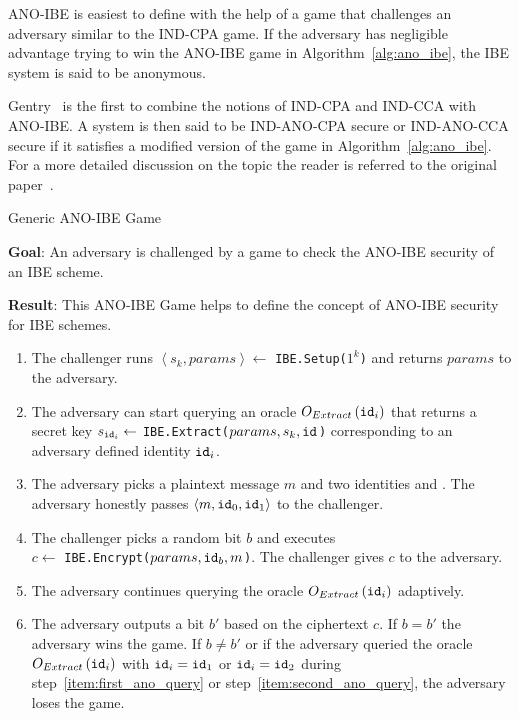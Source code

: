 ANO-IBE is easiest to define with the help of a game that challenges an adversary similar to the IND-CPA game. If the adversary has negligible advantage trying to win the ANO-IBE game in Algorithm~\ref{alg:ano_ibe}, the IBE system is said to be anonymous.

Gentry~\cite{art:Gentry06} is the first to combine the notions of IND-CPA and IND-CCA with ANO-IBE. A system is then said to be IND-ANO-CPA secure or IND-ANO-CCA secure if it satisfies a modified version of the game in Algorithm~\ref{alg:ano_ibe}. For a more detailed discussion on the topic the reader is referred to the original paper~\cite{art:Gentry06}.

\begin{algorithm}
\caption{Generic ANO-IBE Game~\cite{thesis:Alfredo08}}
\label{alg:ano_ibe}
 \textbf{Goal}: An adversary is challenged by a game to check the ANO-IBE security of an IBE scheme.
 
 \textbf{Result}: This ANO-IBE Game helps to define the concept of ANO-IBE security for IBE schemes.
 \begin{enumerate}
  \item The challenger runs $\left< s_k, params\right> \leftarrow$ \texttt{IBE.Setup($1^k$)} and returns $params$ to the adversary.
  \item \label{item:first_ano_query} The adversary can start querying an oracle $O_{Extract} \left( \mathtt{id}_{i} \right)$ that returns a secret key $s_{\mathtt{id}_{i}} \leftarrow$ \texttt{IBE.Extract($params, s_k, \mathtt{id}_{}$)} corresponding to an adversary defined identity $\mathtt{id}_{i}$.
  \item The adversary picks a plaintext message $m$ and two identities  and . The adversary honestly passes $\left< m, \mathtt{id}_{0}, \mathtt{id}_{1} \right>$ to the challenger.
  \item The challenger picks a random bit $b$ and executes \\ $c \leftarrow$ \texttt{IBE.Encrypt($params, \mathtt{id}_{b}, m$)}. The challenger gives $c$ to the adversary.
  \item \label{item:second_ano_query} The adversary continues querying the oracle $O_{Extract} \left( \mathtt{id}_{i} \right)$ adaptively.
  \item The adversary outputs a bit $b'$ based on the ciphertext $c$. If $b = b'$ the adversary wins the game. If $b \neq b'$ or if the adversary queried the oracle $O_{Extract} \left( \mathtt{id}_{i} \right)$ with $\mathtt{id}_{i} = \mathtt{id}_{1}$ or $\mathtt{id}_{i} = \mathtt{id}_{2}$ during step~\ref{item:first_ano_query} or step~\ref{item:second_ano_query}, the adversary loses the game.
 \end{enumerate}
\end{algorithm}

